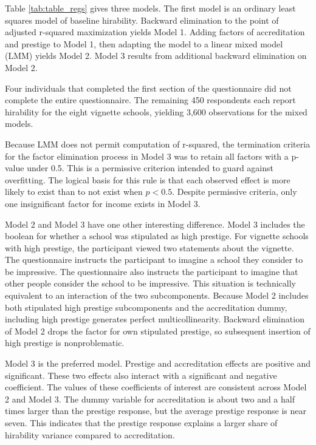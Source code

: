 \documentclass[review]{elsarticle}
\begin{document}
Table \ref{tab:table_regs} gives three models.
The first model is an ordinary least squares model of baseline hirability.
Backward elimination to the point of adjusted r-squared maximization yields Model 1.
Adding factors of accreditation and prestige to Model 1,
then adapting the model to a linear mixed model (LMM) yields Model 2.
Model 3 results from additional backward elimination on Model 2.

Four individuals that completed the first section of the questionnaire
did not complete the entire questionnaire.
The remaining 450 respondents each report hirability for the eight vignette schools,
yielding 3,600 observations for the mixed models.

Because LMM does not permit computation of r-squared,
the termination criteria for the factor elimination process in Model 3
was to retain all factors with a p-value under 0.5.
This is a permissive criterion intended to guard against overfitting.
The logical basis for this rule is that each observed effect is
more likely to exist than to not exist when $p < 0.5$.
Despite permissive criteria, only one insignificant factor for income exists in Model 3.


Model 2 and Model 3 have one other interesting difference.
Model 3 includes the boolean for whether a school was stipulated as high prestige.
For vignette schools with high prestige, the participant viewed two statements about the vignette.
The questionnaire instructs the participant to imagine a school they consider to be impressive.
The questionnaire also instructs the participant to imagine that other people consider the school to be impressive.
This situation is technically equivalent to an interaction of the two subcomponents.
Because Model 2 includes both stipulated high prestige subcomponents and the accreditation dummy, including high prestige generates perfect multicollinearity.
Backward elimination of Model 2 drops the factor for own stipulated prestige, so subsequent insertion of high prestige is nonproblematic.

Model 3 is the preferred model.
Prestige and accreditation effects are positive and significant.
These two effects also interact with a significant and negative coefficient.
The values of these coefficients of interest are consistent across Model 2 and Model 3.
The dummy variable for accreditation is about two and a half times larger than the prestige response,
but the average prestige response is near seven.
This indicates that the prestige response explains a larger share of hirability variance compared to accreditation.
\end{document}
